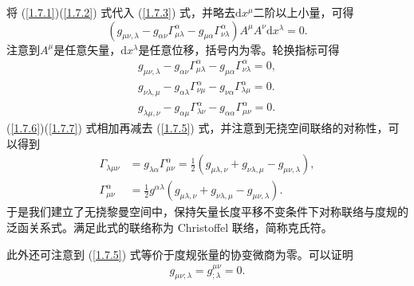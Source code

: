 \documentclass[11pt, a4paper, oneside, onecolumn]{ctexart}
\numberwithin{equation}{subsection}
\begin{document}
将 (\ref{1.7.1})(\ref{1.7.2}) 式代入 (\ref{1.7.3}) 式，并略去$\mathrm{d}x^{\mu}$二阶以上小量，可得
\begin{equation}
\left(g_{\mu\nu,\lambda}-g_{\alpha\nu}\Gamma_{\mu\lambda}^{\alpha}-g_{\mu\alpha}\Gamma_{\nu\lambda}^{\alpha}\right)A^{\mu}A^{\nu}\mathrm{d}x^{\lambda}=0.
\end{equation}
注意到$A^{\mu}$是任意矢量，$\mathrm{d}x^{\lambda}$是任意位移，括号内为零。轮换指标可得
\begin{align}
g_{\mu\nu,\lambda}-g_{\alpha\nu}\Gamma_{\mu\lambda}^{\alpha}-g_{\mu\alpha}\Gamma_{\nu\lambda}^{\alpha}=0,\label{1.7.5}\\
g_{\nu\lambda,\mu}-g_{\alpha\lambda}\Gamma_{\nu\mu}^{\alpha}-g_{\nu\alpha}\Gamma_{\lambda\mu}^{\alpha}=0.\label{1.7.6}\\
g_{\lambda\mu,\nu}-g_{\alpha\mu}\Gamma_{\lambda\nu}^{\alpha}-g_{\alpha\alpha}\Gamma_{\mu\nu}^{\alpha}=0.\label{1.7.7}
\end{align}
(\ref{1.7.6})(\ref{1.7.7}) 式相加再减去 (\ref{1.7.5}) 式，并注意到无挠空间联络的对称性，可以得到
\begin{align}
\Gamma_{\lambda\mu\nu}&=g_{\lambda\alpha}\Gamma_{\mu\nu}^{\alpha}=\frac{1}{2}\left(g_{\mu\lambda,\nu}+g_{\nu\lambda,\mu}-g_{\mu\nu,\lambda}\right),\\
\Gamma_{\mu\nu}^{\alpha}&=\frac12g^{\alpha\lambda}\left(g_{\mu\lambda,\nu}+g_{\nu\lambda,\mu}-g_{\mu\nu,\lambda}\right).
\end{align}
于是我们建立了无挠黎曼空间中，保持矢量长度平移不变条件下对称联络与度规的泛函关系式。满足此式的联络称为 Christoffel 联络，简称克氏符。

此外还可注意到 (\ref{1.7.5}) 式等价于度规张量的协变微商为零。可以证明
\begin{align}
g_{\mu\nu;\lambda}=g^{\mu\nu}_{;\lambda}=0.
\end{align}
\end{document}
